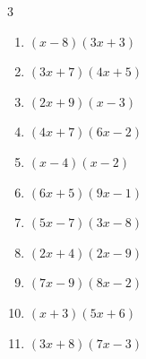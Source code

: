\begin{multicols}{3}
\begin{enumerate}

  \item $(x-8)(3x+3)$


  \item $(3x+7)(4x+5)$


  \item $(2x+9)(x-3)$


  \item $(4x+7)(6x-2)$


  \item $(x-4)(x-2)$


  \item $(6x+5)(9x-1)$


  \item $(5x-7)(3x-8)$


  \item $(2x+4)(2x-9)$


  \item $(7x-9)(8x-2)$


  \item $(x+3)(5x+6)$


  \item $(3x+8)(7x-3)$


\end{enumerate}
\end{multicols}

\newpage
\resetdrill

